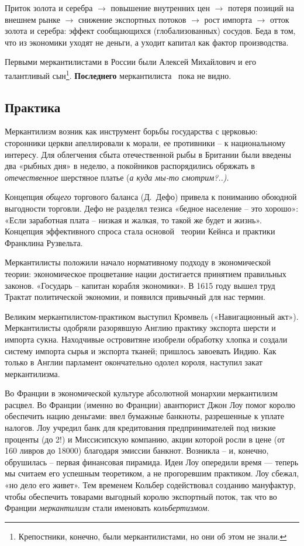 Приток золота и серебра ${\rightarrow}$ повышение внутренних цен ${\rightarrow}$ потеря позиций на внешнем рынке
${\rightarrow}$ снижение экспортных потоков ${\rightarrow}$ рост импорта ${\rightarrow}$ отток золота и серебра: эффект
сообщающихся (глобализованных) сосудов. Беда в том, что из экономики уходят не деньги, а уходит капитал как фактор
производства.

Первыми меркантилистами в России были Алексей Михайлович и его талантливый сын\footnote{Крепостники,
конечно, были меркантилистами, но они об этом не знали.}. \textbf{Последнего} меркантилиста \ пока не видно.

\subsection[Практика]{Практика}
Меркантилизм возник как инструмент борьбы государства с церковью: сторонники церкви апеллировали к морали, ее противники
– к национальному интересу. Для облегчения сбыта отечественной рыбы в Британии были введены два «рыбных дня» в неделю,
а покойников распорядились обряжать в \textit{отечественное }шерстяное платье (\textit{а куда мы-то смотрим?..)}.

Концепция \textit{общего }торгового баланса (Д.~Дефо) привела к пониманию обоюдной выгодности торговли. Дефо не разделял
тезиса «бедное население – это хорошо»: «Если заработная плата – низкая и жалкая, то такой же будет и жизнь». Концепция
эффективного спроса стала основой \ теории Кейнса и практики Франклина Рузвельта.

Меркантилисты положили начало нормативному подходу в экономической теории: экономическое процветание нации достигается
принятием правильных законов. «Государь – капитан корабля экономики». В 1615 году вышел труд \flqq Трактат
политической экономии\frqq, и появился привычный для нас термин.

Великим меркантилистом-практиком выступил Кромвель («Навигационный акт»). Меркантилисты одобряли разорявшую Англию
практику экспорта шерсти и импорта сукна. Находчивые островитяне изобрели обработку хлопка и создали систему импорта
сырья и экспорта тканей; пришлось завоевать Индию. Как только в Англии парламент окончательно одолел короля, наступил
закат меркантилизма.

Во Франции в экономической культуре абсолютной монархии меркантилизм расцвел. Во Франции (именно во Франции) авантюрист
Джон Лоу помог королю обеспечить нацию деньгами: ввел бумажные банкноты, разрешенные к уплате налогов. Лоу учредил банк
для кредитования предпринимателей под низкие проценты (до 2!) и Миссисипскую компанию, акции которой росли в цене (от
160 ливров до 18000) благодаря эмиссии банкнот. Возникла – и, конечно, обрушилась – первая финансовая пирамида. Идеи
Лоу опередили время — теперь мы считаем его успешным теоретиком, а не прогоревшим практиком. Лоу сбежал, «но дело его
живет». Тем временем Кольбер содействовал созданию мануфактур, чтобы обеспечить товарами выгодный королю экспортный
поток, так что во Франции \textit{меркантилизм} стали именовать \textit{кольбертизмом}.

